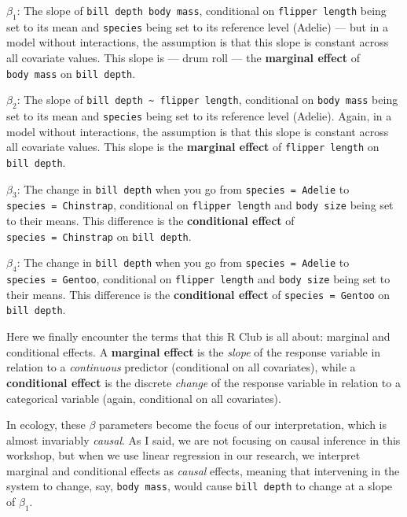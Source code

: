 \documentclass[
]{article}
\begin{document}
\(\beta_1\): The slope of \texttt{bill\ depth\ body\ mass}, conditional
on \texttt{flipper\ length} being set to its mean and \texttt{species}
being set to its reference level (Adelie) --- but in a model without
interactions, the assumption is that this slope is constant across all
covariate values. This slope is --- drum roll --- the \textbf{marginal
effect} of \texttt{body\ mass} on \texttt{bill\ depth}.

\(\beta_2\): The slope of
\texttt{bill\ depth\ \textasciitilde{}\ flipper\ length}, conditional on
\texttt{body\ mass} being set to its mean and \texttt{species} being set
to its reference level (Adelie). Again, in a model without interactions,
the assumption is that this slope is constant across all covariate
values. This slope is the \textbf{marginal effect} of
\texttt{flipper\ length} on \texttt{bill\ depth}.

\(\beta_3\): The change in \texttt{bill\ depth} when you go from
\texttt{species\ =\ Adelie} to \texttt{species\ =\ Chinstrap},
conditional on \texttt{flipper\ length} and \texttt{body\ size} being
set to their means. This difference is the \textbf{conditional effect}
of \texttt{species\ =\ Chinstrap} on \texttt{bill\ depth}.

\(\beta_4\): The change in \texttt{bill\ depth} when you go from
\texttt{species\ =\ Adelie} to \texttt{species\ =\ Gentoo}, conditional
on \texttt{flipper\ length} and \texttt{body\ size} being set to their
means. This difference is the \textbf{conditional effect} of
\texttt{species\ =\ Gentoo} on \texttt{bill\ depth}.

Here we finally encounter the terms that this R Club is all about:
marginal and conditional effects. A \textbf{marginal effect} is the
\emph{slope} of the response variable in relation to a \emph{continuous}
predictor (conditional on all covariates), while a \textbf{conditional
effect} is the discrete \emph{change} of the response variable in
relation to a categorical variable (again, conditional on all
covariates).

In ecology, these \(\beta\) parameters become the focus of our
interpretation, which is almost invariably \emph{causal}. As I said, we
are not focusing on causal inference in this workshop, but when we use
linear regression in our research, we interpret marginal and conditional
effects as \emph{causal} effects, meaning that intervening in the system
to change, say, \texttt{body\ mass}, would cause \texttt{bill\ depth} to
change at a slope of \(\beta_1\).
\end{document}
